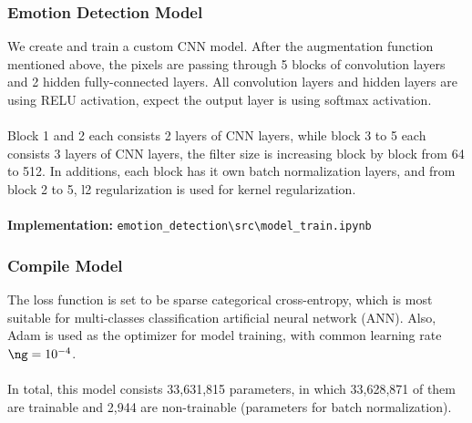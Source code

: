 \documentclass[11pt,a4paper]{article}
\begin{document}
    \subsubsection{Emotion Detection Model}
    We create and train a custom CNN model. After the augmentation function mentioned above, the pixels are passing through 5 blocks of convolution layers and 2 hidden fully-connected layers. All convolution layers and hidden layers  are using RELU activation, expect the output layer is using softmax activation. \\
    \\
    Block 1 and 2 each consists 2 layers of CNN layers, while block 3 to 5 each consists 3 layers of CNN layers, the filter size is increasing block by block from 64 to 512. In additions, each block has it own batch normalization layers, and from block 2 to 5, l2 regularization is used for kernel regularization. \\
    \\
    \textbf{Implementation:} \texttt{emotion\_detection\textbackslash src\textbackslash model\_train.ipynb}
    
    \subsubsection{Compile Model}
    The loss function is set to be sparse categorical cross-entropy, which is most suitable for multi-classes classification artificial neural network (ANN). Also, Adam is used as the optimizer for model training, with common learning rate $\ng = 10^{-4}$. \\
    \\
    In total, this model consists 33,631,815 parameters, in which 33,628,871 of them are trainable and 2,944 are non-trainable (parameters for batch normalization).
    
\end{document}

